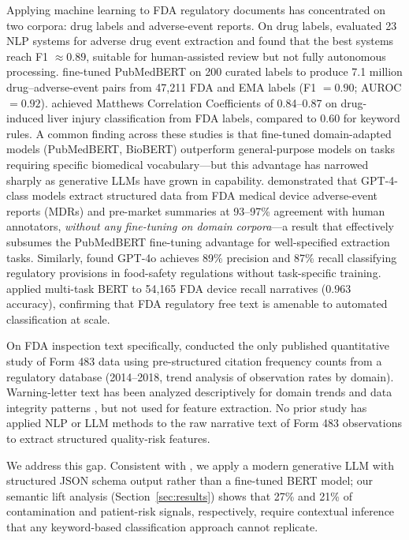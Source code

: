 Applying machine learning to FDA regulatory documents has concentrated on two
corpora: drug labels and adverse-event reports.
On drug labels, \citet{Bayer2021} evaluated 23 NLP systems for adverse drug
event extraction and found that the best systems reach F1 $\approx 0.89$,
suitable for human-assisted review but not fully autonomous processing.
\citet{Tatonetti2025OnSIDES} fine-tuned PubMedBERT on 200 curated labels to
produce 7.1 million drug--adverse-event pairs from 47,211 FDA and EMA labels
(F1 $= 0.90$; AUROC $= 0.92$).
\citet{Wu2021BERT} achieved Matthews Correlation Coefficients of 0.84--0.87
on drug-induced liver injury classification from FDA labels, compared to 0.60
for keyword rules.
A common finding across these studies is that fine-tuned domain-adapted models
(PubMedBERT, BioBERT) outperform general-purpose models on tasks requiring
specific biomedical vocabulary---but this advantage has narrowed sharply as
generative LLMs have grown in capability.
\citet{Li2026LLMDevice} demonstrated that GPT-4-class models extract structured
data from FDA medical device adverse-event reports (MDRs) and pre-market
summaries at 93--97\% agreement with human annotators, \emph{without any
fine-tuning on domain corpora}---a result that effectively subsumes the
PubMedBERT fine-tuning advantage for well-specified extraction tasks.
Similarly, \citet{Hassani2025} found GPT-4o achieves 89\% precision and 87\%
recall classifying regulatory provisions in food-safety regulations without
task-specific training.
\citet{Atalay2026RecallRisk} applied multi-task BERT to 54,165 FDA device
recall narratives (0.963 accuracy), confirming that FDA regulatory free text is
amenable to automated classification at scale.

On FDA inspection text specifically, \citet{Pazhayattil2020} conducted the
only published quantitative study of Form 483 data using pre-structured citation
frequency counts from a regulatory database (2014--2018, trend analysis of
observation rates by domain).
Warning-letter text has been analyzed descriptively for domain trends and data
integrity patterns \citep{Rathore2022, Park2025, Kwiecinski2024}, but not used
for feature extraction.
No prior study has applied NLP or LLM methods to the raw narrative text of Form
483 observations to extract structured quality-risk features.

We address this gap.
Consistent with \citet{Li2026LLMDevice}, we apply a modern generative LLM with
structured JSON schema output rather than a fine-tuned BERT model; our semantic
lift analysis (Section~\ref{sec:results}) shows that 27\% and 21\% of
contamination and patient-risk signals, respectively, require contextual
inference that any keyword-based classification approach cannot replicate.


